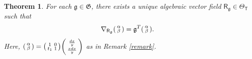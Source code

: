 \documentclass{article}
\numberwithin{equation}{section}
\numberwithin{figure}{section}
\theoremstyle{plain}
\newtheorem{theorem}{Theorem}[section]
\theoremstyle{definition}
\numberwithin{equation}{section}
\newtheorem[S, bodystyle=\normalfont\noindent]{defiS}{Definition}[section]
\begin{document}
\begin{theorem}\label{bigteo}
For each $\mathfrak{g}\in \mathfrak{G}$, there exists a unique algebraic vector field $\mathsf{R}_{\mathfrak{g}}\in \Theta_{\mathsf{T}}$ such that
\begin{equation}\label{equation}
\nabla_{\mathsf{R}_{\mathfrak{g}}} \begin{psmallmatrix}\alpha\\
\beta\end{psmallmatrix}=\mathfrak{g}^T\begin{psmallmatrix}\alpha\\
\beta\end{psmallmatrix}.
\end{equation}
Here, $\begin{psmallmatrix}\alpha\\
\beta\end{psmallmatrix}=\begin{psmallmatrix}1 & 0\\  t_1 & 1\end{psmallmatrix}\begin{psmallmatrix}\frac{dx}{y} \\ \frac{xdx}{y}\end{psmallmatrix}$ as in Remark \ref{remark}.

\end{theorem}
\end{document}
